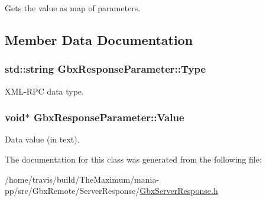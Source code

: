 Gets the value as map of parameters. 



\subsection{Member Data Documentation}
\hypertarget{classGbxResponseParameter_aa1700ca65fa2526b112be24b5c0bdbf4}{
\subsubsection[{Type}]{\setlength{\rightskip}{0pt plus 5cm}std\-::string Gbx\-Response\-Parameter\-::\-Type}}\label{classGbxResponseParameter_aa1700ca65fa2526b112be24b5c0bdbf4}


X\-M\-L-\/\-R\-P\-C data type. 

\hypertarget{classGbxResponseParameter_afcbf7243976fef177ce4c6e8480a4ce3}{
\subsubsection[{Value}]{\setlength{\rightskip}{0pt plus 5cm}void$\ast$ Gbx\-Response\-Parameter\-::\-Value}}\label{classGbxResponseParameter_afcbf7243976fef177ce4c6e8480a4ce3}


Data value (in text). 



The documentation for this class was generated from the following file\-:\begin{DoxyCompactItemize}
\item 
/home/travis/build/\-The\-Maximum/mania-\/pp/src/\-Gbx\-Remote/\-Server\-Response/\hyperlink{GbxServerResponse_8h}{Gbx\-Server\-Response.\-h}\end{DoxyCompactItemize}

